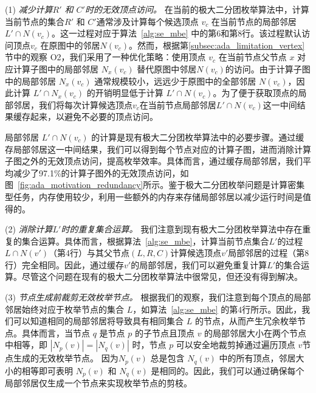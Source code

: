 (1) \textit{减少计算$R'$ 和 $C'$时的无效\emph{顶点}访问。} 
在当前的极大二分团枚举算法中，计算当前节点的集合$R'$ 和 $C'$通常涉及计算每个候选顶点 $v_c$ 在当前节点的局部邻居 $L' \cap N(v_c)$。这一过程对应于算法~\ref{alg:se_mbe} 中的第6和第8行。该过程默认访问顶点$v_c$ 在原图中的邻居$N(v_c)$。然而，根据第\ref{subsec:ada_limitation_vertex}节中的观察 O2，我们采用了一种优化策略：使用顶点 $v_c$ 在当前节点父节点 $x$ 对应计算子图中的局部邻居 $N_x(v_c)$ 替代原图中邻居$N(v_c)$的访问。由于计算子图中的局部邻居 $N_x(v_c)$ 通常规模较小，远远少于原图中的全部邻居 $N(v_c)$，因此计算 $L' \cap N_x(v_c)$ 的开销明显低于计算 $L' \cap N(v_c)$。为了便于获取顶点的局部邻居，我们将每次计算候选顶点$v_c$在当前节点局部邻居$L' \cap N(v_c)$这一中间结果缓存起来，以避免不必要的顶点访问。

局部邻居 $L' \cap N(v_c)$ 的计算是现有极大二分团枚举算法中的必要步骤。通过缓存局部邻居这一中间结果，我们可以得到每个节点对应的计算子图，进而消除计算子图之外的无效顶点访问，提高枚举效率。具体而言，通过缓存局部邻居，我们平均减少了97.1\%的计算子图外的无效顶点访问，如图~\ref{fig:ada_motivation_redundancy}所示。鉴于极大二分团枚举问题是计算密集型任务，内存使用较少，利用一些额外的内存来存储局部邻居以减少运行时间是值得的。

(2) \textit{消除计算$L'$时的重复\emph{集合}运算。}
我们注意到现有极大二分团枚举算法中存在重复的集合运算。具体而言，根据算法~\ref{alg:se_mbe}，计算当前节点集合$L'$的过程$L \cap N(v')$（第4行）与其父节点$(L, R, C)$计算候选顶点$v'$局部邻居的过程（第8行）完全相同。因此，通过缓存$v'$的局部邻居，我们可以避免重复计算$L'$的集合运算。尽管这个问题在现有的极大二分团枚举算法中很常见，但还没有得到解决。

(3) \textit{节点生成前裁剪无效\emph{枚举节点}。}
根据我们的观察，我们注意到每个顶点的局部邻居始终对应于枚举节点的集合 $L$，如算法~\ref{alg:se_mbe} 的第4行所示。因此，我们可以知道相同的局部邻居将导致具有相同集合 $L$ 的节点，从而产生冗余枚举节点。具体而言，当节点 $q$ 是节点 $p$ 的子节点且顶点 $v$ 的局部邻居大小在两个节点中相等，即 $|N_p(v)| = |N_q(v)|$ 时，节点 $p$ 可以安全地裁剪掉通过遍历顶点 $v$节点生成的无效枚举节点。 因为$N_p(v)$ 总是包含 $N_q(v)$ 中的所有顶点，邻居大小的相等即可表明 $N_p(v)$ 和 $N_q(v)$ 是相同的。因此，我们可以通过确保每个局部邻居仅生成一个节点来实现枚举节点的剪枝。






